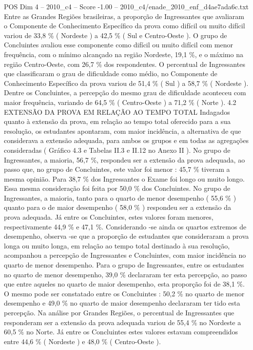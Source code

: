 \begin{textsample}{POS Dim 4 – 2010\_c4 – Score -1.00 – 2010\_c4/enade\_2010\_enf\_d4ae7ada6c.txt}
Entre as Grandes Regiões brasileiras, a proporção de Ingressantes que avaliaram o Componente de Conhecimento Específico da prova como difícil ou muito difícil variou de 33,8 \% ( Nordeste ) a 42,5 \% ( Sul e Centro-Oeste ).
O grupo de Concluintes avaliou esse componente como difícil ou muito difícil com menor frequência, com o mínimo alcançado na região Nordeste, 19,1 \%, e o máximo na região Centro-Oeste, com 26,7 \% dos respondentes.
O percentual de Ingressantes que classificaram o grau de dificuldade como médio, no Componente de Conhecimento Específico da prova variou de 51,4 \% ( Sul ) a 58,7 \% ( Nordeste ).
Dentre os Concluintes, a percepção do mesmo grau de dificuldade aconteceu com maior frequência, variando de 64,5 \% ( Centro-Oeste ) a 71,2 \% ( Norte ). 4.2 EXTENSÃO DA PROVA EM RELAÇÃO AO TEMPO TOTAL Indagados quanto à extensão da prova, em relação ao tempo total oferecido para a sua resolução, os estudantes apontaram, com maior incidência, a alternativa de que considerava a extensão adequada, para ambos os grupos e em todas as agregações consideradas ( Gráfico 4.3 e Tabelas II.3 e II.12 no Anexo II ).
No grupo de Ingressantes, a maioria, 56,7 \%, respondeu ser a extensão da prova adequada, ao passo que, no grupo de Concluintes, este valor foi menor : 45,7 \% tiveram a mesma opinião.
Para 38,7 \% dos Ingressantes o Exame foi longo ou muito longo.
Essa mesma consideração foi feita por 50,0 \% dos Concluintes.
No grupo de Ingressantes, a maioria, tanto para o quarto de menor desempenho ( 55,6 \% ) quanto para o de maior desempenho ( 58,0 \% ) respondeu ser a extensão da prova adequada.
Já entre os Concluintes, estes valores foram menores, respectivamente 44,9 \% e 47,1 \%.
Considerando -se ainda os quartos extremos de desempenho, observa -se que a proporção de estudantes que consideraram a prova longa ou muito longa, em relação ao tempo total destinado à sua resolução, acompanhou a percepção de Ingressantes e Concluintes, com maior incidência no quarto de menor desempenho.
Para o grupo de Ingressantes, entre os estudantes no quarto de menor desempenho, 39,0 \% declararam ter esta percepção, ao passo que entre aqueles no quarto de maior desempenho, esta proporção foi de 38,1 \%.
O mesmo pode ser constatado entre os Concluintes : 50,2 \% no quarto de menor desempenho e 49,0 \% no quarto de maior desempenho declararam ter tido esta percepção.
Na análise por Grandes Regiões, o percentual de Ingressantes que responderam ser a extensão da prova adequada variou de 55,4 \% no Nordeste a 60,5 \% no Norte.
Já entre os Concluintes estes valores estavam compreendidos entre 44,6 \% ( Nordeste ) e 48,0 \% ( Centro-Oeste ).

\end{textsample}
